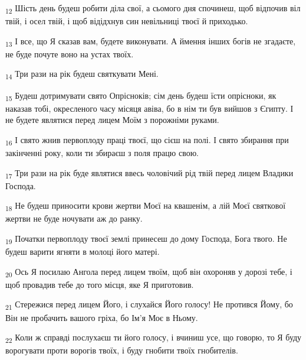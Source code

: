 \begin{tcolorbox}
\textsubscript{12} Шість день будеш робити діла свої, а сьомого дня спочинеш, щоб відпочив віл твій, і осел твій, і щоб відідхнув син невільниці твоєї й приходько.
\end{tcolorbox}
\begin{tcolorbox}
\textsubscript{13} І все, що Я сказав вам, будете виконувати. А ймення інших богів не згадаєте, не буде почуте воно на устах твоїх.
\end{tcolorbox}
\begin{tcolorbox}
\textsubscript{14} Три рази на рік будеш святкувати Мені.
\end{tcolorbox}
\begin{tcolorbox}
\textsubscript{15} Будеш дотримувати свято Опрісноків; сім день будеш їсти опрісноки, як наказав тобі, окресленого часу місяця авіва, бо в нім ти був вийшов з Єгипту. І не будете являтися перед лицем Моїм з порожніми руками.
\end{tcolorbox}
\begin{tcolorbox}
\textsubscript{16} І свято жнив первоплоду праці твоєї, що сієш на полі. І свято збирання при закінченні року, коли ти збираєш з поля працю свою.
\end{tcolorbox}
\begin{tcolorbox}
\textsubscript{17} Три рази на рік буде являтися ввесь чоловічий рід твій перед лицем Владики Господа.
\end{tcolorbox}
\begin{tcolorbox}
\textsubscript{18} Не будеш приносити крови жертви Моєї на квашенім, а лій Моєї святкової жертви не буде ночувати аж до ранку.
\end{tcolorbox}
\begin{tcolorbox}
\textsubscript{19} Початки первоплоду твоєї землі принесеш до дому Господа, Бога твого. Не будеш варити ягняти в молоці його матері.
\end{tcolorbox}
\begin{tcolorbox}
\textsubscript{20} Ось Я посилаю Ангола перед лицем твоїм, щоб він охороняв у дорозі тебе, і щоб провадив тебе до того місця, яке Я приготовив.
\end{tcolorbox}
\begin{tcolorbox}
\textsubscript{21} Стережися перед лицем Його, і слухайся Його голосу! Не протився Йому, бо Він не пробачить вашого гріха, бо Ім'я Моє в Ньому.
\end{tcolorbox}
\begin{tcolorbox}
\textsubscript{22} Коли ж справді послухаєш ти його голосу, і вчиниш усе, що говорю, то Я буду ворогувати проти ворогів твоїх, і буду гнобити твоїх гнобителів.
\end{tcolorbox}
